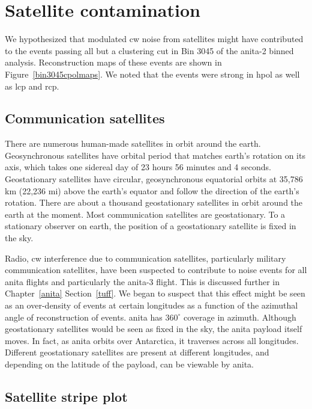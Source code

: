 \section{Satellite contamination}
\label{satellite}

We hypothesized that modulated \gls{cw} noise from satellites might have contributed to the events passing all but a clustering cut in Bin 3045 of the \gls{anita}-2 binned analysis. Reconstruction maps of these events are shown in Figure~\ref{bin3045cpolmaps}. We noted that the events were strong in \gls{hpol} as well as \gls{lcp} and \gls{rcp}. 

\subsection{Communication satellites}

There are numerous human-made satellites in orbit around the earth. Geosynchronous satellites have orbital period that matches earth's rotation on its axis, which takes one sidereal day of 23 hours 56 minutes and 4 seconds. Geostationary satellites have circular, geosynchronous equatorial orbits at 35,786 km
(22,236 mi) above the earth's equator and follow the direction of the earth's rotation. There are about a thousand geostationary satellites in orbit around the earth at the moment. Most communication satellites are geostationary. To a stationary observer on earth, the position of a geostationary satellite is fixed in the sky. 

Radio, \gls{cw} interference due to communication satellites, particularly military communication satellites, have been suspected to contribute to noise events for all \gls{anita} flights and particularly the \gls{anita}-3 flight. This is discussed further in Chapter~\ref{anita} Section~\ref{tuff}. We began to suspect that this effect might be seen as an over-density of events at certain longitudes as a function of the azimuthal angle of reconstruction of events. \gls{anita} has $360^{\circ}$ coverage in azimuth. Although geostationary satellites would be seen as fixed in the sky, the \gls{anita} payload itself moves. In fact, as \gls{anita} orbits over Antarctica, it traverses across all longitudes. Different geostationary satellites are present at different longitudes, and depending on the latitude of the payload, can be viewable by \gls{anita}.

\subsection{Satellite stripe plot}

